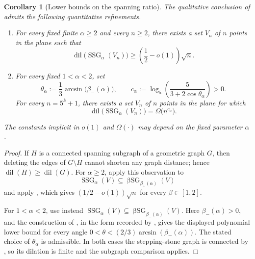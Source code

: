 \documentclass[a4paper,fleqn]{cas-sc}
\newtheorem{corollary}{Corollary}
\theoremstyle{definition}
\theoremstyle{remark}
\newcommand{\0}{\mathbf{0}}
\DeclareMathOperator{\SSG}{SSG}
\DeclareMathOperator{\BSG}{\beta SG}
\begin{document}
\begin{corollary}[Lower bounds on the spanning ratio]
\label{cor:quantitative-dilation}
The qualitative conclusion of  admits the
following quantitative refinements.
\begin{enumerate}
\item[(i)] For every fixed finite $\alpha\geq2$ and every $n\geq2$, there
exists a set $V_n$ of $n$ points in the plane such that
\begin{equation}
    \operatorname{dil}\bigl(\SSG_\alpha(V_n)\bigr)
    \geq
    \left(\frac12-o(1)\right)\sqrt n.
\end{equation}
\item[(ii)] For every fixed $1<\alpha<2$, set
\begin{equation}
    \theta_\alpha
    :=\frac13\arcsin\bigl(\beta_-(\alpha)\bigr),
    \qquad
    c_\alpha
    :=\log_5\!\left(
       \frac{5}{3+2\cos\theta_\alpha}
    \right)>0.
\end{equation}
For every $n=5^k+1$, there exists a set $V_n$ of $n$ points in the plane
for which
\begin{equation}
    \operatorname{dil}\bigl(\SSG_\alpha(V_n)\bigr)
    =\Omega\bigl(n^{c_\alpha}\bigr).
\end{equation}
\end{enumerate}
The constants implicit in $o(1)$ and $\Omega(\cdot)$ may depend on the
fixed parameter $\alpha$.
\end{corollary}

\begin{proof}
If $H$ is a connected spanning subgraph of a geometric graph $G$, then
deleting the edges of $G\setminus H$ cannot shorten any graph distance;
hence $\operatorname{dil}(H)\geq\operatorname{dil}(G)$.  For
$\alpha\geq2$, apply this observation to
\begin{equation}
    \SSG_\alpha(V)
    \subseteq \BSG_{\beta_+(\alpha)}(V)
\end{equation}
and apply \citet[Theorem~3.2]{bose2006spanning}, which gives
$(1/2-o(1))\sqrt n$ for every $\beta\in[1,2]$.

For $1<\alpha<2$, use instead
$\SSG_\alpha(V)\subseteq \BSG_{\beta_-(\alpha)}(V)$.  Here
$\beta_-(\alpha)>0$, and the construction of
\citet[Theorem~1]{eppstein2002beta}, in the form recorded by
\citet[Theorem~3.1]{bose2006spanning}, gives the displayed polynomial
lower bound for every angle
$0<\theta<(2/3)\arcsin(\beta_-(\alpha))$.  The stated choice of
$\theta_\alpha$ is admissible.  In both cases the stepping-stone graph is
connected by , so its dilation is finite and the
subgraph comparison applies.
\end{proof}
\end{document}
